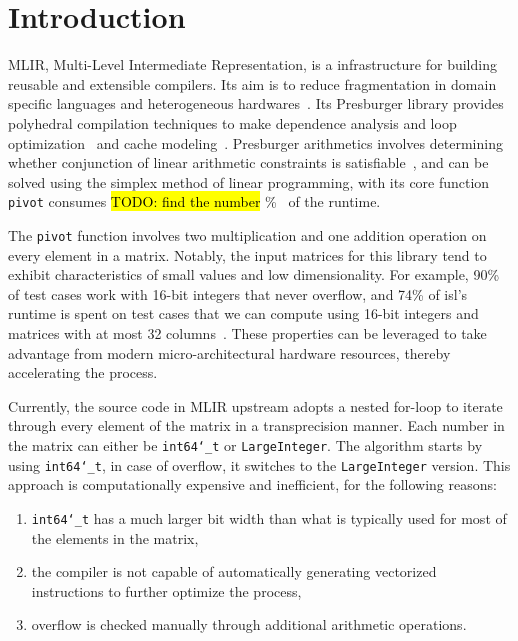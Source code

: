 \documentclass[logo,bsc,singlespacing,parskip]{infthesis}
\newcommand{\dtlong}{\texttt{int64\char`_t}}
\newcommand{\pivot}{\texttt{pivot}}
\begin{document}
\chapter{Introduction}
\label{sec:introduction}

MLIR, Multi-Level Intermediate Representation, is a infrastructure for building
reusable and extensible compilers. Its aim is to reduce fragmentation in domain
specific languages and heterogeneous hardwares~\cite{mlir}. Its Presburger
library provides polyhedral compilation techniques to make dependence analysis
and loop optimization~\cite{mliraffine} and cache modeling~\cite{CacheModel}.
Presburger arithmetics involves determining whether conjunction of linear
arithmetic constraints is satisfiable~\cite{SMLPPA}, and can be solved using the
simplex method of linear programming, with its core function \pivot{} consumes
\hl{TODO: find the number} \%~\cite{FPL1} of the runtime. 

The \texttt{pivot} function involves two multiplication and one addition
operation on every element in a matrix. Notably, the input matrices for this
library tend to exhibit characteristics of small values and low dimensionality.
For example, 90\% of test cases work with 16-bit integers that never overflow,
and 74\% of isl’s runtime is spent on test cases that we can compute using
16-bit integers and matrices with at most 32 columns~\cite{FPL2}. These
properties can be leveraged to take advantage from modern micro-architectural
hardware resources, thereby accelerating the process.

Currently, the source code in MLIR upstream adopts a nested for-loop to iterate
through every element of the matrix in a transprecision manner. Each number in
the matrix can either be \dtlong{} or \texttt{LargeInteger}. The
algorithm starts by using \dtlong{}, in case of overflow, it switches to
the \texttt{LargeInteger} version. This approach is computationally expensive
and inefficient, for the following reasons: 
\begin{enumerate}

\item \dtlong{} has a much larger bit width than what is typically
used for most of the elements in the matrix,

\item the compiler is not capable of automatically generating vectorized
instructions to further optimize the process,

\item overflow is checked manually through additional arithmetic
operations.

\end{enumerate}
\end{document}
